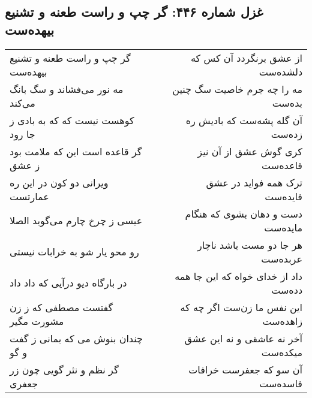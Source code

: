 \begin{center}
\section*{غزل شماره ۴۴۶: گر چپ و راست طعنه و تشنیع بیهده‌ست}
\label{sec:0446}
\begin{longtable}{l p{0.5cm} r}
گر چپ و راست طعنه و تشنیع بیهده‌ست
&&
از عشق برنگردد آن کس که دلشده‌ست
\\
مه نور می‌فشاند و سگ بانگ می‌کند
&&
مه را چه جرم خاصیت سگ چنین بده‌ست
\\
کوهست نیست که که به بادی ز جا رود
&&
آن گله پشه‌ست که بادیش ره زده‌ست
\\
گر قاعده است این که ملامت بود ز عشق
&&
کری گوش عشق از آن نیز قاعده‌ست
\\
ویرانی دو کون در این ره عمارتست
&&
ترک همه فواید در عشق فایده‌ست
\\
عیسی ز چرخ چارم می‌گوید الصلا
&&
دست و دهان بشوی که هنگام مایده‌ست
\\
رو محو یار شو به خرابات نیستی
&&
هر جا دو مست باشد ناچار عربده‌ست
\\
در بارگاه دیو درآیی که داد داد
&&
داد از خدای خواه که این جا همه دده‌ست
\\
گفتست مصطفی که ز زن مشورت مگیر
&&
این نفس ما زن‌ست اگر چه که زاهده‌ست
\\
چندان بنوش می که بمانی ز گفت و گو
&&
آخر نه عاشقی و نه این عشق میکده‌ست
\\
گر نظم و نثر گویی چون زر جعفری
&&
آن سو که جعفرست خرافات فاسده‌ست
\\
\end{longtable}
\end{center}
